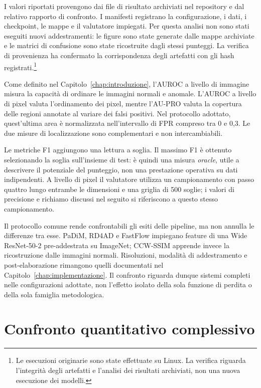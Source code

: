 I valori riportati provengono dai file di risultato archiviati nel repository e dal relativo rapporto di confronto. I manifesti registrano la configurazione, i dati, i checkpoint, le mappe e il valutatore impiegati. Per questa analisi non sono stati eseguiti nuovi addestramenti: le figure sono state generate dalle mappe archiviate e le matrici di confusione sono state ricostruite dagli stessi punteggi. La verifica di provenienza ha confermato la corrispondenza degli artefatti con gli hash registrati.\footnote{Le esecuzioni originarie sono state effettuate su Linux. La verifica riguarda l'integrità degli artefatti e l'analisi dei risultati archiviati, non una nuova esecuzione dei modelli.}

Come definito nel Capitolo~\ref{chap:introduzione}, l'AUROC a livello di immagine misura la capacità di ordinare le immagini normali e anomale. L'AUROC a livello di pixel valuta l'ordinamento dei pixel, mentre l'AU-PRO valuta la copertura delle regioni annotate al variare dei falsi positivi. Nel protocollo adottato, quest'ultima area è normalizzata nell'intervallo di FPR compreso tra 0 e 0,3. Le due misure di localizzazione sono complementari e non intercambiabili.

Le metriche F1 aggiungono una lettura a soglia. Il massimo F1 è ottenuto selezionando la soglia sull'insieme di test: è quindi una misura \emph{oracle}, utile a descrivere il potenziale del punteggio, non una prestazione operativa su dati indipendenti. A livello di pixel il valutatore utilizza un campionamento con passo quattro lungo entrambe le dimensioni e una griglia di 500 soglie; i valori di precisione e richiamo discussi nel seguito si riferiscono a questo stesso campionamento.

Il protocollo comune rende confrontabili gli esiti delle pipeline, ma non annulla le differenze tra esse. PaDiM, RD4AD e FastFlow impiegano feature di una Wide ResNet-50-2 pre-addestrata su ImageNet; CCW-SSIM apprende invece la ricostruzione dalle immagini normali. Risoluzioni, modalità di addestramento e post-elaborazione rimangono quelli documentati nel Capitolo~\ref{chap:implementazione}. Il confronto riguarda dunque sistemi completi nelle configurazioni adottate, non l'effetto isolato della sola funzione di perdita o della sola famiglia metodologica.

\section{Confronto quantitativo complessivo}
\label{sec:cap4-quantitativo}


